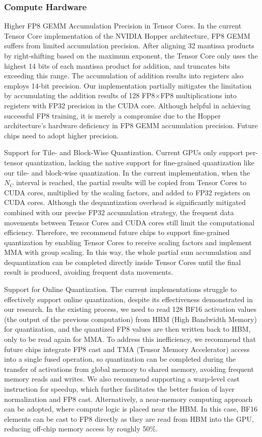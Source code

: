 \documentclass[11pt,a4paper]{article}
\begin{document}
\subsubsection{Compute Hardware}

Higher FP8 GEMM Accumulation Precision in Tensor Cores. In the current Tensor Core implementation of the NVIDIA Hopper architecture, FP8 GEMM suffers from limited accumulation precision. After aligning 32 mantissa products by right-shifting based on the maximum exponent, the Tensor Core only uses the highest 14 bits of each mantissa product for addition, and truncates bits exceeding this range. The accumulation of addition results into registers also employs 14-bit precision. Our implementation partially mitigates the limitation by accumulating the addition results of 128 FP8$\times$FP8 multiplications into registers with FP32 precision in the CUDA core. Although helpful in achieving successful FP8 training, it is merely a compromise due to the Hopper architecture's hardware deficiency in FP8 GEMM accumulation precision. Future chips need to adopt higher precision.

Support for Tile- and Block-Wise Quantization. Current GPUs only support per-tensor quantization, lacking the native support for fine-grained quantization like our tile- and block-wise quantization. In the current implementation, when the $N_C$ interval is reached, the partial results will be copied from Tensor Cores to CUDA cores, multiplied by the scaling factors, and added to FP32 registers on CUDA cores. Although the dequantization overhead is significantly mitigated combined with our precise FP32 accumulation strategy, the frequent data movements between Tensor Cores and CUDA cores still limit the computational efficiency. Therefore, we recommend future chips to support fine-grained quantization by enabling Tensor Cores to receive scaling factors and implement MMA with group scaling. In this way, the whole partial sum accumulation and dequantization can be completed directly inside Tensor Cores until the final result is produced, avoiding frequent data movements.

Support for Online Quantization. The current implementations struggle to effectively support online quantization, despite its effectiveness demonstrated in our research. In the existing process, we need to read 128 BF16 activation values (the output of the previous computation) from HBM (High Bandwidth Memory) for quantization, and the quantized FP8 values are then written back to HBM, only to be read again for MMA. To address this inefficiency, we recommend that future chips integrate FP8 cast and TMA (Tensor Memory Accelerator) access into a single fused operation, so quantization can be completed during the transfer of activations from global memory to shared memory, avoiding frequent memory reads and writes. We also recommend supporting a warp-level cast instruction for speedup, which further facilitates the better fusion of layer normalization and FP8 cast. Alternatively, a near-memory computing approach can be adopted, where compute logic is placed near the HBM. In this case, BF16 elements can be cast to FP8 directly as they are read from HBM into the GPU, reducing off-chip memory access by roughly 50\%.
\end{document}
